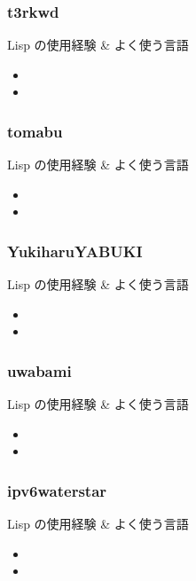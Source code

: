 \documentclass[cjk,dvipdfmx,12pt,compress,%
hyperref={bookmarks=true,bookmarksnumbered=true,bookmarksopen=false,%
colorlinks=false,%
pdftitle={第 120 回 関西 Debian 勉強会},%
pdfauthor={倉敷・のがた・佐々木・かわだ・おおつき},%
pdfsubject={資料},%
}]{beamer}
\begin{document}
\begin{frame}[fragile]
  \frametitle{t3rkwd}
  \begin{block}{Lisp の使用経験 \& よく使う言語}
    \begin{itemize}
      \item 
      \item 
    \end{itemize}
  \end{block}
\end{frame}

\begin{frame}[fragile]
  \frametitle{tomabu}
  \begin{block}{Lisp の使用経験 \& よく使う言語}
    \begin{itemize}
      \item 
      \item 
    \end{itemize}
  \end{block}
\end{frame}

\begin{frame}[fragile]
  \frametitle{YukiharuYABUKI}
  \begin{block}{Lisp の使用経験 \& よく使う言語}
    \begin{itemize}
      \item 
      \item 
    \end{itemize}
  \end{block}
\end{frame}

\begin{frame}[fragile]
  \frametitle{uwabami}
  \begin{block}{Lisp の使用経験 \& よく使う言語}
    \begin{itemize}
      \item 
      \item 
    \end{itemize}
  \end{block}
\end{frame}

\begin{frame}[fragile]
  \frametitle{ipv6waterstar}
  \begin{block}{Lisp の使用経験 \& よく使う言語}
    \begin{itemize}
      \item 
      \item 
    \end{itemize}
  \end{block}
\end{frame}
\end{document}
